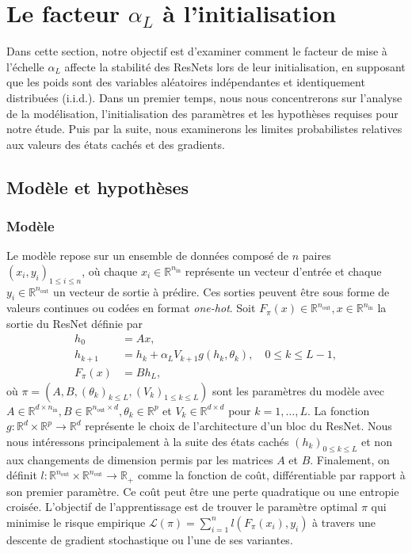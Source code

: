 \chapter{Le facteur $\alpha_L$ à l'initialisation}
Dans cette section, notre objectif est d'examiner comment le facteur de mise à l'échelle $\alpha_L$ affecte la stabilité des ResNets lors de leur initialisation, en supposant que les poids sont des variables aléatoires indépendantes et identiquement distribuées (i.i.d.). Dans un premier temps, nous nous concentrerons sur l'analyse de la modélisation, l'initialisation des paramètres et les hypothèses requises pour notre étude. Puis par la suite, nous examinerons les limites probabilistes relatives aux valeurs des états cachés et des gradients.

\section{Modèle et hypothèses}
\subsection*{Modèle}
Le modèle repose sur un ensemble de données composé de $n$ paires $(x_i, y_i)_{1 \leq i \leq n}$, où chaque $x_i \in \mathbb{R}^{n_{\text{in}}}$ représente un vecteur d'entrée et chaque $y_i \in \mathbb{R}^{n_{\text{out}}}$ un vecteur de sortie à prédire. Ces sorties peuvent être sous forme de valeurs continues ou codées en format \textit{one-hot}. Soit $F_\pi(x) \in \mathbb{R}^{n_{\text{out}}}, x \in \mathbb{R}^{n_{\text{in}}}$ la sortie du ResNet définie par 
\begin{align}\label{ResNet_equation}
    h_0 &= Ax, \nonumber\\
    h_{k+1} &= h_k + \alpha_L V_{k+1}g(h_k, \theta_k), \quad 0 \leq k \leq L - 1, \\
    F_{\pi}(x) &= Bh_L, \nonumber
\end{align}
où $\pi = (A, B, (\theta_k)_{k \leq L}, (V_k)_{1 \leq k \leq L})$ sont les paramètres du modèle avec $A \in \mathbb{R}^{d \times n_{\text{in}}}, B \in \mathbb{R}^{n_{\text{out}} \times d}, \theta_k \in \mathbb{R}^p$ et $V_k \in \mathbb{R}^{d \times d}$ pour $k = 1, \ldots, L$. La fonction $g : \mathbb{R}^d \times \mathbb{R}^p \to \mathbb{R}^d$ représente le choix de l'architecture d'un bloc du ResNet. Nous nous intéressons principalement à la suite des états cachés $(h_k)_{0 \leq k \leq L}$ et non aux changements de dimension permis par les matrices $A$ et $B$.
Finalement, on définit $l: \mathbb{R}^{n_{\text{out}}} \times \mathbb{R}^{n_{\text{out}}} \to \mathbb{R}_+$ comme la fonction de coût, différentiable par rapport à son premier paramètre. Ce coût peut être une perte quadratique ou une entropie croisée. L'objectif de l'apprentissage est de trouver le paramètre optimal $\pi$ qui minimise le risque empirique $\mathscr{L}(\pi) = \sum_{i=1}^{n} l(F_\pi(x_i), y_i)$ à travers une descente de gradient stochastique ou l'une de ses variantes.

